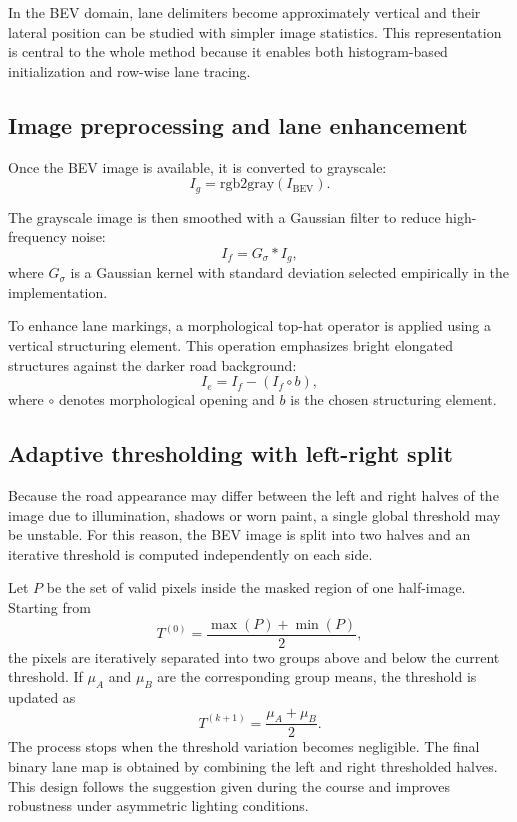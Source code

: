 \documentclass[conference]{IEEEtran}
\begin{document}
In the BEV domain, lane delimiters become approximately vertical and their lateral position can be studied with simpler image statistics. This representation is central to the whole method because it enables both histogram-based initialization and row-wise lane tracing.

\subsection{Image preprocessing and lane enhancement}
Once the BEV image is available, it is converted to grayscale:
\begin{equation}
I_g = \mathrm{rgb2gray}(I_{\text{BEV}}).
\end{equation}

The grayscale image is then smoothed with a Gaussian filter to reduce high-frequency noise:
\begin{equation}
I_f = G_\sigma * I_g,
\end{equation}
where $G_\sigma$ is a Gaussian kernel with standard deviation selected empirically in the implementation.

To enhance lane markings, a morphological top-hat operator is applied using a vertical structuring element. This operation emphasizes bright elongated structures against the darker road background:
\begin{equation}
I_e = I_f - (I_f \circ b),
\end{equation}
where $\circ$ denotes morphological opening and $b$ is the chosen structuring element.

\subsection{Adaptive thresholding with left-right split}
Because the road appearance may differ between the left and right halves of the image due to illumination, shadows or worn paint, a single global threshold may be unstable. For this reason, the BEV image is split into two halves and an iterative threshold is computed independently on each side.

Let $P$ be the set of valid pixels inside the masked region of one half-image. Starting from
\begin{equation}
T^{(0)} = \frac{\max(P) + \min(P)}{2},
\end{equation}
the pixels are iteratively separated into two groups above and below the current threshold. If $\mu_A$ and $\mu_B$ are the corresponding group means, the threshold is updated as
\begin{equation}
T^{(k+1)} = \frac{\mu_A + \mu_B}{2}.
\end{equation}
The process stops when the threshold variation becomes negligible. The final binary lane map is obtained by combining the left and right thresholded halves. This design follows the suggestion given during the course and improves robustness under asymmetric lighting conditions.
\end{document}
